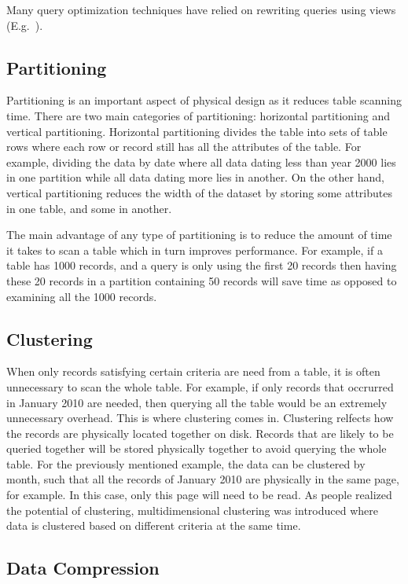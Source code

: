 \documentclass[12pt,a4paper]{article}
\begin{document}
Many query optimization techniques have relied on rewriting queries using views (E.g.~\cite{levy1995answering, gupta1995aggregate, goldstein2001optimizing, abiteboul1998complexity}).

\subsection{Partitioning}

Partitioning is an important aspect of physical design as it reduces table scanning time. There are two main categories of partitioning: horizontal partitioning and vertical partitioning. Horizontal partitioning divides the table into sets of table rows where each row or record still has all the attributes of the table. For example, dividing the data by date where all data dating less than year 2000 lies in one partition while all data dating more lies in another. On the other hand, vertical partitioning reduces the width of the dataset by storing some attributes in one table, and some in another.

The main advantage of any type of partitioning is to reduce the amount of time it takes to scan a table which in turn improves performance. For example, if a table has 1000 records, and a query is only using the first 20 records then having these 20 records in a partition containing 50 records will save time as opposed to examining all the 1000 records.

\subsection{Clustering}
When only records satisfying certain criteria are need from a table, it is often unnecessary to scan the whole table. For example, if only records that occrurred in January 2010 are needed, then querying all the table would be an extremely unnecessary overhead. This is where clustering comes in. Clustering relfects how the records are physically located together on disk. Records that are likely to be queried together will be stored physically together to avoid querying the whole table. For the previously mentioned example, the data can be clustered by month, such that all the records of January 2010 are physically in the same page, for example. In this case, only this page will need to be read. As people realized the potential of clustering, multidimensional clustering was introduced where data is clustered based on different criteria at the same time.

\subsection{Data Compression}
\end{document}
